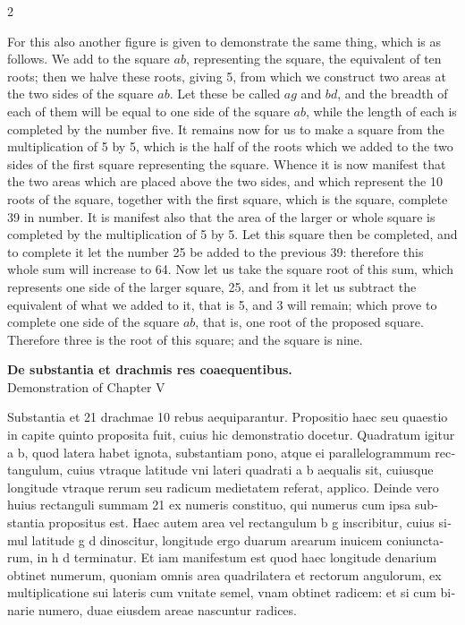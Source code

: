 \documentclass[11pt,a4paper,twoside]{book}
\newcommand{\latincolumn}[1]{\textlatin{\small #1}}
\begin{document}
\begin{paracol}{2}
\switchcolumn

For this also another figure is given to demonstrate the same thing, which is as follows. We add to the square $ab$, representing the square, the equivalent of ten roots; then we halve these roots, giving 5, from which we construct two areas at the two sides of the square $ab$. Let these be called $ag$ and $bd$, and the breadth of each of them will be equal to one side of the square $ab$, while the length of each is completed by the number five. It remains now for us to make a square from the multiplication of 5 by 5, which is the half of the roots which we added to the two sides of the first square representing the square. Whence it is now manifest that the two areas which are placed above the two sides, and which represent the 10 roots of the square, together with the first square, which is the square, complete 39 in number. It is manifest also that the area of the larger or whole square is completed by the multiplication of 5 by 5. Let this square then be completed, and to complete it let the number 25 be added to the previous 39: therefore this whole sum will increase to 64. Now let us take the square root of this sum, which represents one side of the larger square, 25, and from it let us subtract the equivalent of what we added to it, that is 5, and 3 will remain; which prove to complete one side of the square $ab$, that is, one root of the proposed square. Therefore three is the root of this square; and the square is nine.

\switchcolumn*

\begin{center}
{\normalsize\bfseries\color{sectioncolor} De substantia et drachmis res coaequentibus.}\\[0.2cm]
\latincolumn{Demonstration of Chapter V}
\end{center}

\medskip

\latincolumn{Substantia et 21 drachmae 10 rebus aequiparantur. Propositio haec seu quaestio in capite quinto proposita fuit, cuius hic demonstratio docetur. Quadratum igitur a b, quod latera habet ignota, substantiam pono, atque ei parallelogrammum rectangulum, cuius vtraque latitude vni lateri quadrati a b aequalis sit, cuiusque longitude vtraque rerum seu radicum medietatem referat, applico. Deinde vero huius rectanguli summam 21 ex numeris constituo, qui numerus cum ipsa substantia propositus est. Haec autem area vel rectangulum b g inscribitur, cuius simul latitude g d dinoscitur, longitude ergo duarum arearum inuicem coniunctarum, in h d terminatur. Et iam manifestum est quod haec longitude denarium obtinet numerum, quoniam omnis area quadrilatera et rectorum angulorum, ex multiplicatione sui lateris cum vnitate semel, vnam obtinet radicem: et si cum binarie numero, duae eiusdem areae nascuntur radices.}


\end{paracol}
\end{document}
